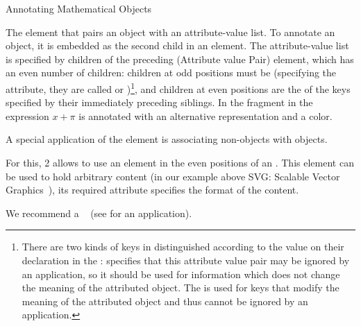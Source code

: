 \begin{omgroup}[id=mobj,short=Mathematical Objects]
\begin{omgroup}[id=annotating]{Annotating Mathematical Objects}
\begin{definition}[id=omattr.def]
  The {} element that pairs an {\openmath} object with an
  attribute-value list. To annotate an {\openmath} object, it is embedded as the second
  child in an  element. The attribute-value list is specified
  by children of the preceding {} (Attribute value Pair) element,
  which has an even number of children: children at odd positions must be
   (specifying the attribute, they are called  or
  )\footnote{There are two kinds of keys in {\openmath} distinguished
    according to the  value on their  declaration
    in the :  specifies
    that this attribute value pair may be ignored by an application, so it should be used
    for information which does not change the meaning of the attributed {\openmath}
    object. The  is used for keys that modify the meaning of the
    attributed {\openmath} object and thus cannot be ignored by an application.}, and
  children at even positions are the  of the keys specified by their
  immediately preceding siblings. In the {\openmath} fragment in {} the
  expression $x+\pi$ is annotated with an alternative representation and a color.
\end{definition}

A special application of the  element is associating
non-\openmath objects with \openmath objects.

\begin{definition}[id=omforeign.def]
  For this, {\openmath}2 allows to use an  element in the even
  positions of an . This element can be used to hold arbitrary
  {\xml} content (in our example above SVG: Scalable Vector Graphics~\cite{W3C:svg02}),
  its required  attribute specifies the format
  of the content.
\end{definition}

We recommend a ~\cite{FreBor:MIME96} (see  for an
application).


\end{omgroup}
\end{omgroup}
